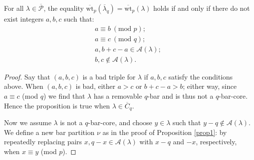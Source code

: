 \documentclass[ALCO, Unicode,published]{cedram}
\begin{document}
\begin{prop}\label{prop2}
For all $\lambda\in\overline{\mathcal{P}}$, the equality $\overline{\text{wt}}_p(\overline{\lambda}_q)=\overline{\text{wt}}_p(\lambda)$ holds if and only if there do not exist integers $a,b,c$ such that: 
\begin{align*}a\equiv b\:(\text{mod }p);\\
a\equiv c\:(\text{mod }q);\\
a,b+c-a\in\mathcal{A}(\lambda);\\
b,c\not\in\mathcal{A}(\lambda).\end{align*}
\end{prop}
\begin{proof}
Say that $(a,b,c)$ is a bad triple for $\lambda$ if $a,b,c$ satisfy the conditions above. When $(a,b,c)$ is bad, either $a>c$ or $b+c-a>b$; either way, since $a\equiv c$ (mod $q$) we find that $\lambda$ has a removable $q$-bar and is thus not a $q$-bar-core. Hence the proposition is true when $\lambda\in\overline{C}_q$. 

Now we assume $\lambda$ is not a $q$-bar-core, and choose $y\in\lambda$ such that $y-q\not\in\mathcal{A}(\lambda)$. We define a new bar partition $\nu$ as in the proof of Proposition \ref{prop1}: by repeatedly replacing pairs $x,q-x\in\mathcal{A}(\lambda)$ with $x-q$ and $-x$, respectively, when $x\equiv y$ (mod $p$). 


\end{proof}
\end{document}
